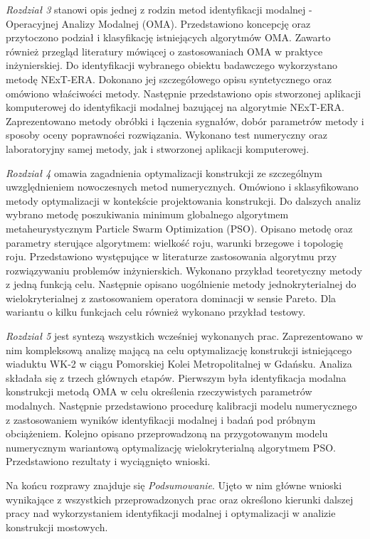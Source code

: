 \textit{Rozdział 3} stanowi opis jednej z rodzin metod identyfikacji modalnej - Operacyjnej Analizy Modalnej (OMA). Przedstawiono koncepcję oraz przytoczono podział i klasyfikację istniejących algorytmów OMA. Zawarto również przegląd literatury mówiącej o zastosowaniach OMA w praktyce inżynierskiej. Do identyfikacji wybranego obiektu badawczego wykorzystano metodę NExT-ERA. Dokonano jej szczegółowego opisu syntetycznego oraz omówiono właściwości metody. Następnie przedstawiono opis stworzonej aplikacji komputerowej do identyfikacji modalnej bazującej na algorytmie NExT-ERA. Zaprezentowano metody obróbki i łączenia sygnałów, dobór parametrów metody i sposoby oceny poprawności rozwiązania. Wykonano test numeryczny oraz laboratoryjny samej metody, jak i stworzonej aplikacji komputerowej.

\textit{Rozdział 4} omawia zagadnienia optymalizacji konstrukcji ze szczególnym uwzględnieniem nowoczesnych metod numerycznych. Omówiono i sklasyfikowano metody optymalizacji w kontekście projektowania konstrukcji. Do dalszych analiz wybrano metodę poszukiwania minimum globalnego algorytmem metaheurystycznym Particle Swarm Optimization (PSO). Opisano metodę oraz parametry sterujące algorytmem: wielkość roju, warunki brzegowe i topologię roju. Przedstawiono występujące w literaturze zastosowania algorytmu przy rozwiązywaniu problemów inżynierskich. Wykonano przykład teoretyczny metody z jedną funkcją celu. Następnie opisano uogólnienie metody jednokryterialnej do wielokryterialnej z zastosowaniem operatora dominacji w sensie Pareto. Dla wariantu o kilku funkcjach celu również wykonano przykład testowy.

\textit{Rozdział 5} jest syntezą wszystkich wcześniej wykonanych prac. Zaprezentowano w nim kompleksową analizę mającą na celu optymalizację konstrukcji istniejącego wiaduktu WK-2 w ciągu Pomorskiej Kolei Metropolitalnej w Gdańsku. Analiza składała się z trzech głównych etapów. Pierwszym była identyfikacja modalna konstrukcji metodą OMA w celu określenia rzeczywistych parametrów modalnych. Następnie przedstawiono procedurę kalibracji modelu numerycznego z zastosowaniem wyników identyfikacji modalnej i badań pod próbnym obciążeniem. Kolejno opisano przeprowadzoną na przygotowanym modelu numerycznym wariantową optymalizację wielokryterialną algorytmem PSO. Przedstawiono rezultaty i wyciągnięto wnioski.

Na końcu rozprawy znajduje się \textit{Podsumowanie}. Ujęto w nim główne wnioski wynikające z wszystkich przeprowadzonych prac oraz określono kierunki dalszej pracy nad wykorzystaniem identyfikacji modalnej i optymalizacji w analizie konstrukcji mostowych.





